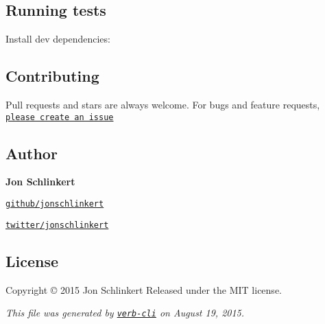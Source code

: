 \subsection*{Running tests}

Install dev dependencies\+:




\subsection*{Contributing}

Pull requests and stars are always welcome. For bugs and feature requests, \href{https://github.com/jonschlinkert/pascalcase/issues/new}{\tt please create an issue}

\subsection*{Author}

{\bfseries Jon Schlinkert}


\begin{DoxyItemize}
\item \href{https://github.com/jonschlinkert}{\tt github/jonschlinkert}
\item \href{http://twitter.com/jonschlinkert}{\tt twitter/jonschlinkert}
\end{DoxyItemize}

\subsection*{License}

Copyright © 2015 Jon Schlinkert Released under the M\+IT license.





{\itshape This file was generated by \href{https://github.com/assemble/verb-cli}{\tt verb-\/cli} on August 19, 2015.} 